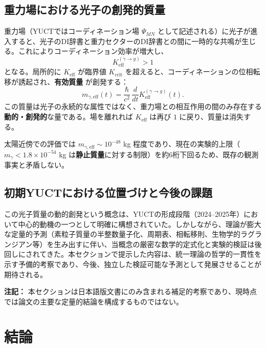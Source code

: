 \documentclass[12pt,a4paper]{article}
\begin{document}
\subsection{重力場における光子の創発的質量}

重力場（YUCTではコーディネーション場 \(\Psi_{MN}\) として記述される）に光子が進入すると、光子のDI辞書と重力セクターのDI辞書との間に一時的な共鳴が生じる。これによりコーディネーション効率が増大し、
\begin{equation}
	K_{\mathrm{eff}}^{(\gamma\to g)} > 1
\end{equation}
となる。局所的に \(K_{\mathrm{eff}}\) が臨界値 \(K_{\mathrm{crit}}\) を超えると、コーディネーションの位相転移が誘起され、\textbf{有効質量} が創発する：
\begin{equation}
	m_{\gamma,\mathrm{eff}}(t) = \frac{\hbar}{c^2}\,\frac{d}{dt}K_{\mathrm{eff}}^{(\gamma\to g)}(t).
\end{equation}
この質量は光子の永続的な属性ではなく、重力場との相互作用の間のみ存在する\textbf{動的・創発的}な量である。場を離れれば \(K_{\mathrm{eff}}\) は再び \(1\) に戻り、質量は消失する。

太陽近傍での評価では \(m_{\gamma,\mathrm{eff}}\sim 10^{-48}\) kg 程度であり、現在の実験的上限（\(m_\gamma < 1.8\times10^{-54}\) kg は\textbf{静止質量}に対する制限）を約6桁下回るため、既存の観測事実と矛盾しない。

\subsection{初期YUCTにおける位置づけと今後の課題}

この光子質量の動的創発という概念は、YUCTの形成段階（2024–2025年）において中心的動機の一つとして明確に構想されていた。しかしながら、理論が膨大な定量的予測（素粒子質量の半整数量子化、周期表、相転移則、生物学的ラグランジアン等）を生み出すに伴い、当概念の厳密な数学的定式化と実験的検証は後回しにされてきた。本セクションで提示した内容は、統一理論の哲学的一貫性を示す予備的考察であり、今後、独立した検証可能な予測として発展させることが期待される。

\vspace{0.5cm}
\noindent\textbf{注記：} 本セクションは日本語版文書にのみ含まれる補足的考察であり、現時点では論文の主要な定量的結論を構成するものではない。

	\section{結論}
	
\end{document}
